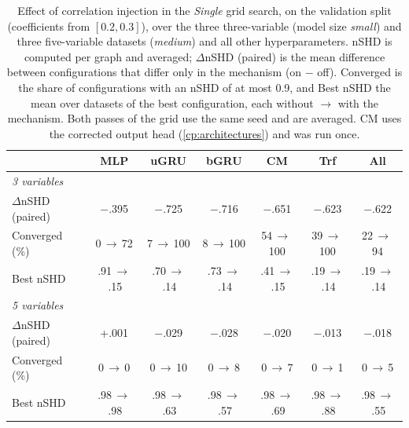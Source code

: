 \begin{table}[ht]
    \centering
    \small
    \setlength{\tabcolsep}{3pt}
    \begin{tabular}{lccccc|c}
    \toprule
        ~ & \textbf{MLP} & \textbf{uGRU} & \textbf{bGRU} & \textbf{CM} & \textbf{Trf} & \textbf{All} \\
    \midrule
        \textit{3 variables} & \multicolumn{6}{c}{} \\
        \quad $\Delta$nSHD (paired) & $-$.395 & $-$.725 & $-$.716 & $-$.651 & $-$.623 & $-$.622 \\
        \quad Converged (\%) & 0\,$\to$\,72 & 7\,$\to$\,100 & 8\,$\to$\,100 & 54\,$\to$\,100 & 39\,$\to$\,100 & 22\,$\to$\,94 \\
        \quad Best nSHD & .91\,$\to$\,.15 & .70\,$\to$\,.14 & .73\,$\to$\,.14 & .41\,$\to$\,.15 & .19\,$\to$\,.14 & .19\,$\to$\,.14 \\
        \textit{5 variables} & \multicolumn{6}{c}{} \\
        \quad $\Delta$nSHD (paired) & +.001 & $-$.029 & $-$.028 & $-$.020 & $-$.013 & $-$.018 \\
        \quad Converged (\%) & 0\,$\to$\,0 & 0\,$\to$\,10 & 0\,$\to$\,8 & 0\,$\to$\,7 & 0\,$\to$\,1 & 0\,$\to$\,5 \\
        \quad Best nSHD & .98\,$\to$\,.98 & .98\,$\to$\,.63 & .98\,$\to$\,.57 & .98\,$\to$\,.69 & .98\,$\to$\,.88 & .98\,$\to$\,.55 \\
    \bottomrule
    \end{tabular}
    \caption{Effect of correlation injection in the \emph{Single} grid search, on the validation split (coefficients from $[0.2,0.3]$), over the three three-variable (model size \emph{small}) and three five-variable datasets (\emph{medium}) and all other hyperparameters. nSHD is computed per graph and averaged; $\Delta$nSHD (paired) is the mean difference between configurations that differ only in the mechanism (on $-$ off). Converged is the share of configurations with an nSHD of at most 0.9, and Best nSHD the mean over datasets of the best configuration, each without $\to$ with the mechanism. Both passes of the grid use the same seed and are averaged. CM uses the corrected output head (\cref{cp:architectures}) and was run once.}
    \label{tab:cp:ci:nshd}
\end{table}
